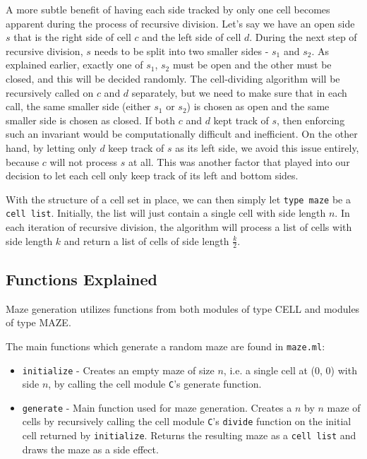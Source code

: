 \documentclass[11pt, margin=1in]{article}
\newcommand{\tab}{\par \qquad}
\begin{document}
A more subtle benefit of having each side tracked by only one cell becomes apparent during the process of recursive division.  Let's say we have an open side $s$ that is the right side of cell $c$ and the left side of cell $d$.  During the next step of recursive division, $s$ needs to be split into two smaller sides - $s_1$ and $s_2$.  As explained earlier, exactly one of $s_1$, $s_2$ must be open and the other must be closed, and this will be decided randomly.  The cell-dividing algorithm will be recursively called on $c$ and $d$ separately, but we need to make sure that in each call, the same smaller side (either $s_1$ or $s_2$) is chosen as open and the same smaller side is chosen as closed.  If both $c$ and $d$ kept track of $s$, then enforcing such an invariant would be computationally difficult and inefficient.  On the other hand, by letting only $d$ keep track of $s$ as its left side, we avoid this issue entirely, because $c$ will not process $s$ at all.  This was another factor that played into our decision to let each cell only keep track of its left and bottom sides.    

\tab With the structure of a cell set in place, we can then simply let \texttt{type maze} be a \texttt{cell list}.  Initially, the list will just contain a single cell with side length $n$.  In each iteration of recursive division, the algorithm will process a list of cells with side length $k$ and return a list of cells of side length $\frac{k}{2}$.                   
   
\subsection{Functions Explained} 
Maze generation utilizes functions from both modules of type \textsc{CELL} and modules of type \textsc{MAZE}.  

The main functions which generate a random maze are found in \texttt{maze.ml}:
\begin{itemize}
\item \texttt{initialize} - Creates an empty maze of size $n$, i.e. a single cell at (0, 0) with side $n$, by calling the cell module \texttt{C}'s generate function.
\item \texttt{generate} - Main function used for maze generation. Creates a $n$ by $n$ maze of cells by recursively calling the cell module \texttt{C}'s \texttt{divide} function on the initial cell returned by \texttt{initialize}. Returns the resulting maze as a \texttt{cell list} and draws the maze as a side effect.
\end{itemize}
\end{document}
